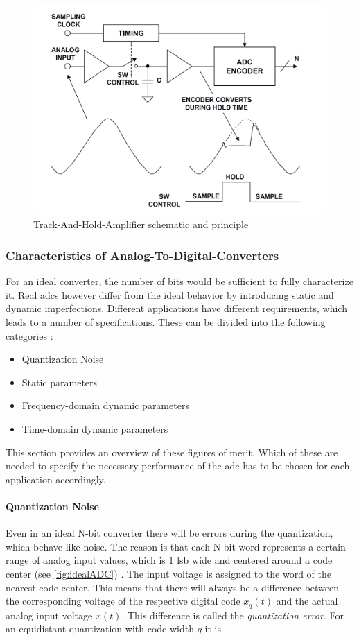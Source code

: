 \begin{figure}[tbh]
	\centering
	\includegraphics[width = \textwidth]{chap/02-theory/img/tha}
	\caption{Track-And-Hold-Amplifier schematic and principle \cite{walt}}
	\label{fig:tha}
\end{figure}

\subsubsection*{Characteristics of Analog-To-Digital-Converters}
For an ideal converter, the number of bits would be sufficient to fully characterize it.
Real \glspl{adc} however differ from the ideal behavior by introducing static and dynamic imperfections.
Different applications have different requirements, which leads to a number of specifications. These can be divided into the following categories \cite{Lundberg}:
\begin{itemize}[noitemsep]
	\item Quantization Noise
	\item Static parameters
	\item Frequency-domain dynamic parameters
	\item Time-domain dynamic parameters
\end{itemize}
This section provides an overview of these figures of merit. Which of these are needed to specify the necessary performance of the \gls{adc} has to be chosen for each application accordingly.

\paragraph{Quantization Noise}\label{par:quant_noise}
Even in an ideal N-bit converter there will be errors during the quantization, which behave like noise. The reason is that each N-bit word represents a certain range of analog input values, which is 1 \gls{lsb} wide and centered around a code center (see \autoref{fig:idealADC}) \cite{Lundberg}. The input voltage is assigned to the word of the nearest code center. This means that there will always be a difference between the corresponding voltage of the respective digital code $x_q(t)$ and the actual analog input voltage  $x(t)$. This difference is called the \textit{quantization error}. For an equidistant quantization with code width $q$ it is

